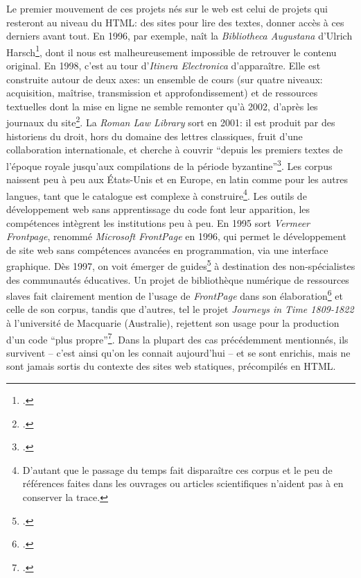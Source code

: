 Le premier mouvement de ces projets nés sur le web est celui de projets qui resteront au niveau du HTML: des sites pour lire des textes, donner accès à ces derniers avant tout. En 1996, par exemple, naît la \textit{Bibliotheca Augustana} d'Ulrich Harsch\footcite{harsch_bibliotheca_nodate}, dont il nous est malheureusement impossible de retrouver le contenu original. En 1998, c'est au tour d'\textit{Itinera Electronica} d'apparaître. Elle est construite autour de deux axes: un ensemble de cours (sur quatre niveaux: acquisition, maîtrise, transmission et approfondissement) et de ressources textuelles dont la mise en ligne ne semble remonter qu'à 2002, d'après les journaux du site\footcite{meurant_itinera_nodate}. La \textit{Roman Law Library} sort en 2001: il est produit par des historiens du droit, hors du domaine des lettres classiques, fruit d'une collaboration internationale, et cherche à couvrir ``depuis les premiers textes de l'époque royale jusqu'aux compilations de la période byzantine''\footcite{lassard_roman_2001}. Les corpus naissent peu à peu aux États-Unis et en Europe, en latin comme pour les autres langues, tant que le catalogue est complexe à construire\footnote{D'autant que le passage du temps fait disparaître ces corpus et le peu de références faites dans les ouvrages ou articles scientifiques n'aident pas à en conserver la trace.}. Les outils de développement web sans apprentissage du code font leur apparition, les compétences intègrent les institutions peu à peu. En 1995 sort \textit{Vermeer Frontpage}, renommé \textit{Microsoft FrontPage} en 1996, qui permet le développement de site web sans compétences avancées en programmation, via une interface graphique. Dès 1997, on voit émerger de guides\footcite{la1997guide} à destination des non-spécialistes des communautés éducatives. Un projet de bibliothèque numérique de ressources slaves fait clairement mention de l'usage de \textit{FrontPage} dans son élaboration\footcite{deyrup1998character} et celle de son corpus, tandis que d'autres, tel le projet \textit{Journeys in Time 1809-1822} à l'université de Macquarie (Australie), rejettent son usage pour la production d'un code ``plus propre''\footcite[p.~41]{10.3316/informit.752609435027594}. Dans la plupart des cas précédemment mentionnés, ils survivent -- c'est ainsi qu'on les connait aujourd'hui -- et se sont enrichis, mais ne sont jamais sortis du contexte des sites web statiques, précompilés en HTML.

